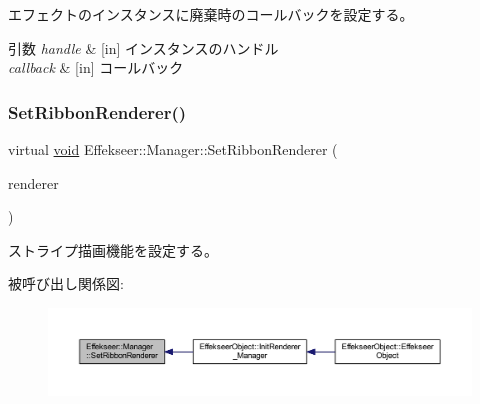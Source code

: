 エフェクトのインスタンスに廃棄時のコールバックを設定する。 


\begin{DoxyParams}{引数}
{\em handle} & \mbox{[}in\mbox{]} インスタンスのハンドル \\
\hline
{\em callback} & \mbox{[}in\mbox{]} コールバック \\
\hline
\end{DoxyParams}
\mbox{\label{class_effekseer_1_1_manager_afe6fa26d93c9c80a0afb8f4fbe0afe20}} 
\subsubsection{\texorpdfstring{Set\+Ribbon\+Renderer()}{SetRibbonRenderer()}}
{\footnotesize\ttfamily virtual \mbox{\hyperlink{namespace_effekseer_ab34c4088e512200cf4c2716f168deb56}{void}} Effekseer\+::\+Manager\+::\+Set\+Ribbon\+Renderer (\begin{DoxyParamCaption}\item[{\mbox{\hyperlink{class_effekseer_1_1_ribbon_renderer}{Ribbon\+Renderer}} $\ast$}]{renderer }\end{DoxyParamCaption})\hspace{0.3cm}{\ttfamily [pure virtual]}}



ストライプ描画機能を設定する。 

被呼び出し関係図\+:\nopagebreak
\begin{figure}[H]
\begin{center}
\leavevmode
\includegraphics[width=350pt]{class_effekseer_1_1_manager_afe6fa26d93c9c80a0afb8f4fbe0afe20_icgraph}
\end{center}
\end{figure}
\mbox{\label{class_effekseer_1_1_manager_afe6f77af79fd2bea3a36eed5b5dea383}} 
